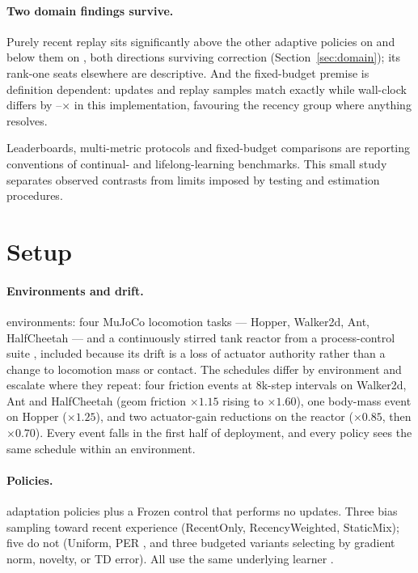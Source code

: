 \documentclass{article}
\begin{document}
\paragraph{Two domain findings survive.}
Purely recent replay sits significantly above the other adaptive policies on
\RevAbove{} and below them on \RevBelow{}, both directions surviving
correction (Section~\ref{sec:domain}); its rank-one seats elsewhere are
descriptive. And the fixed-budget premise is definition dependent: updates
and replay samples match exactly while wall-clock differs by
\WallSpreadMin--\WallSpreadMax$\times$ in this implementation, favouring the
recency group where anything resolves.

Leaderboards, multi-metric protocols and fixed-budget comparisons are
reporting conventions of continual- and lifelong-learning benchmarks. This
small study separates observed contrasts from limits imposed by testing and
estimation procedures.

\section{Setup}
\label{sec:setup}

\paragraph{Environments and drift.} \NEnv{} environments: four MuJoCo
locomotion tasks \citep{todorov2012mujoco} --- Hopper, Walker2d, Ant,
HalfCheetah --- and a continuously stirred tank reactor from a process-control
suite \citep{bloor2024pcgym}, included because its drift is a loss of actuator
authority rather than a change to locomotion mass or contact. The schedules
differ by environment and escalate where they repeat: four friction events at
$8$k-step intervals on Walker2d, Ant and HalfCheetah (geom friction
$\times 1.15$ rising to $\times 1.60$), one body-mass event on Hopper
($\times 1.25$), and two actuator-gain reductions on the reactor
($\times 0.85$, then $\times 0.70$). Every event falls in the first half of
deployment, and every policy sees the same schedule within an environment.

\paragraph{Policies.} \NPolHopper{} adaptation policies plus a Frozen control
that performs no updates. Three bias sampling toward recent experience
(\textsf{RecentOnly}, \textsf{RecencyWeighted}, \textsf{StaticMix}); five do
not (\textsf{Uniform}, \textsf{PER} \citep{schaul2016per}, and three budgeted
variants selecting by gradient norm, novelty, or TD error). All use the same
underlying learner \citep{haarnoja2018sac}.
\end{document}
